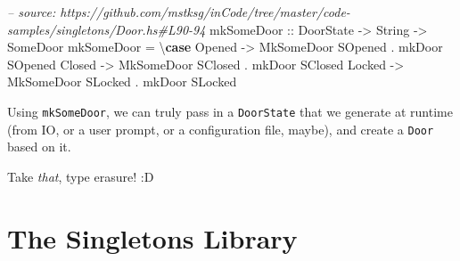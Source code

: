 \documentclass[]{article}
\newenvironment{Shaded}{}{}
\newcommand{\KeywordTok}[1]{\textcolor[rgb]{0.00,0.44,0.13}{\textbf{#1}}}
\newcommand{\DataTypeTok}[1]{\textcolor[rgb]{0.56,0.13,0.00}{#1}}
\newcommand{\StringTok}[1]{\textcolor[rgb]{0.25,0.44,0.63}{#1}}
\newcommand{\CommentTok}[1]{\textcolor[rgb]{0.38,0.63,0.69}{\textit{#1}}}
\newcommand{\OtherTok}[1]{\textcolor[rgb]{0.00,0.44,0.13}{#1}}
\newcommand{\FunctionTok}[1]{\textcolor[rgb]{0.02,0.16,0.49}{#1}}
\newcommand{\NormalTok}[1]{#1}
\begin{document}
\begin{Shaded}
\begin{Highlighting}[]
\CommentTok{-- source: https://github.com/mstksg/inCode/tree/master/code-samples/singletons/Door.hs#L90-94}
\OtherTok{mkSomeDoor ::} \DataTypeTok{DoorState} \OtherTok{->} \DataTypeTok{String} \OtherTok{->} \DataTypeTok{SomeDoor}
\NormalTok{mkSomeDoor }\FunctionTok{=}\NormalTok{ \textbackslash{}}\KeywordTok{case}
    \DataTypeTok{Opened} \OtherTok{->} \DataTypeTok{MkSomeDoor} \DataTypeTok{SOpened} \FunctionTok{.}\NormalTok{ mkDoor }\DataTypeTok{SOpened}
    \DataTypeTok{Closed} \OtherTok{->} \DataTypeTok{MkSomeDoor} \DataTypeTok{SClosed} \FunctionTok{.}\NormalTok{ mkDoor }\DataTypeTok{SClosed}
    \DataTypeTok{Locked} \OtherTok{->} \DataTypeTok{MkSomeDoor} \DataTypeTok{SLocked} \FunctionTok{.}\NormalTok{ mkDoor }\DataTypeTok{SLocked}
\end{Highlighting}
\end{Shaded}

\begin{Shaded}
\end{Shaded}

Using \texttt{mkSomeDoor}, we can truly pass in a \texttt{DoorState} that we
generate at runtime (from IO, or a user prompt, or a configuration file, maybe),
and create a \texttt{Door} based on it.

Take \emph{that}, type erasure! :D

\section{The Singletons Library}\label{the-singletons-library}
\end{document}
